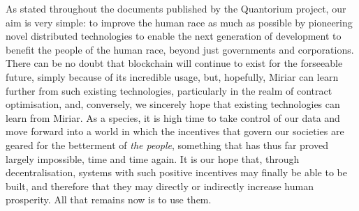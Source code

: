 \documentclass{extreport}
\begin{document}
As stated throughout the documents published by the Quantorium project, our aim is very simple: to improve the human race as much as possible by pioneering novel distributed technologies to enable the next generation of development to benefit the people of the human race, beyond just governments and corporations. There can be no doubt that blockchain will continue to exist for the forseeable future, simply because of its incredible usage, but, hopefully, Miriar can learn further from such existing technologies, particularly in the realm of contract optimisation, and, conversely, we sincerely hope that existing technologies can learn from Miriar. As a species, it is high time to take control of our data and move forward into a world in which the incentives that govern our societies are geared for the betterment of \emph{the people}, something that has thus far proved largely impossible, time and time again. It is our hope that, through decentralisation, systems with such positive incentives may finally be able to be built, and therefore that they may directly or indirectly increase human prosperity. All that remains now is to use them.
\end{document}
